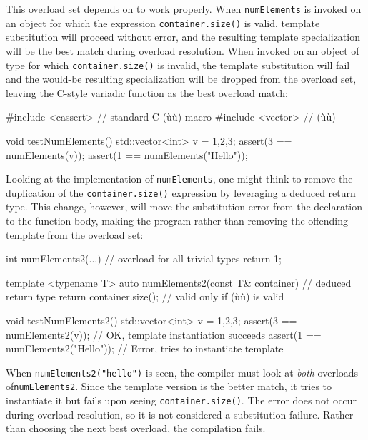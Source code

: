 \noindent This overload set depends on  to work properly. When
\lstinline!numElements! is invoked on an object for which the expression
\lstinline!container.size()! is valid, template substitution will proceed
without error, and the resulting template specialization will be the
best match during overload resolution. When invoked on an object of
 type for which \lstinline!container.size()! is invalid,
the template substitution will fail and the would-be resulting
specialization will be dropped from the overload set, leaving the
C-style variadic function as the best overload match:

\begin{emcppslisting}[emcppsbatch=e8]
#include <cassert>  // standard C (ù{}ù) macro
#include <vector>   // (ù{}ù)

void testNumElements()
{
   std::vector<int> v = {1,2,3};
   assert(3 == numElements(v));
   assert(1 == numElements("Hello"));
}
\end{emcppslisting}
    

\noindent Looking at the implementation of \lstinline!numElements!, one might think
to remove the duplication of the \lstinline!container.size()! expression by
leveraging a deduced return type. This change, however, will move the
substitution error from the declaration to the function body, making the
program  rather than removing the offending template
from the overload set:

\begin{emcppslisting}[emcppsbatch=e8]
int numElements2(...)  // overload for all trivial types
{
    return 1;
}

template <typename T>
auto numElements2(const T& container)  // deduced return type
{
    return container.size();  // valid only if (ù{}ù) is valid
}

void testNumElements2()
{
    std::vector<int> v = {1,2,3};
    assert(3 == numElements2(v));        // OK, template instantiation succeeds
    assert(1 == numElements2("Hello"));  // Error, tries to instantiate template
}
\end{emcppslisting}
    

\noindent When \lstinline!numElements2("hello")! is seen, the compiler must look at
\emph{both} overloads of\linebreak[4] \lstinline!numElements2!. Since the template
version is the better match, it tries to instantiate it but fails upon
seeing \lstinline!container.size()!. The error does not occur during
overload resolution, so it is not considered a substitution failure.
Rather than choosing the next best overload, the compilation fails.

